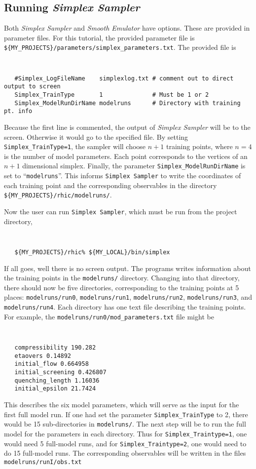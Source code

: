 \documentclass[UserManual.tex]{subfiles}
\begin{document}
\subsection{Running {\it Simplex Sampler}}

Both {\it Simplex Sampler} and {\it Smooth Emulator} have options. These are provided in parameter files. For this tutorial, the provided parameter file is {\tt \$\{MY\_PROJECTS\}/parameters/simplex\_parameters.txt}. The provided file is
{\tt
\begin{verbatim}
   #Simplex_LogFileName    simplexlog.txt # comment out to direct output to screen
   Simplex_TrainType       1              # Must be 1 or 2             
   Simplex_ModelRunDirName modelruns      # Directory with training pt. info
\end{verbatim}
}
Because the first line is commented, the output of {\it Simplex Sampler} will be to the screen. Otherwise it would go to the specified file. By setting {\tt Simplex\_TrainType=1}, the sampler will choose $n+1$ training points, where $n=4$ is the number of model parameters. Each point corresponds to the vertices of an $n+1$ dimensional simplex.  Finally, the parameter {\tt Simplex\_ModelRunDirName} is set to ``{\tt modelruns}''. This informs {\tt Simplex Sampler} to write the coordinates of each training point and the corresponding observables in the directory {\tt \$\{MY\_PROJECTS\}/rhic/modelruns/}. 

Now the user can run {\tt Simplex Sampler}, which must be run from the project directory,
 {\tt
\begin{verbatim}
   ${MY_PROJECTS}/rhic% ${MY_LOCAL}/bin/simplex
\end{verbatim}
}
If all goes, well there is no screen output. The programs writes information about the training points in the {\tt modelruns/} directory. Changing into that directory, there should now be five directories, corresponding to the training points at 5 places: {\tt modelruns/run0}, {\tt modelruns/run1}, {\tt modelruns/run2}, {\tt modelruns/run3}, and {\tt modelruns/run4}. Each directory has one text file describing the training points. For example, the {\tt modelruns/run0/mod\_parameters.txt} file might be 
{\tt
\begin{verbatim}
   compressibility 190.282
   etaovers 0.14892
   initial_flow 0.664958
   initial_screening 0.426807
   quenching_length 1.16036
   initial_epsilon 21.7424
\end{verbatim}
}
This describes the six model parameters, which will serve as the input for the first full model run. If one had set the parameter {\tt Simplex\_TrainType} to 2, there would be 15 sub-directories in {\tt modelruns/}. The next step will be to run the full model for the parameters in each directory. Thus for {\tt Simplex\_Traintype=1}, one would need 5 full-model runs, and for {\tt Simplex\_Traintype=2}, one would need to do 15 full-model runs. The corresponding observables will be written in the files {\tt modelruns/runI/obs.txt}
\end{document}
